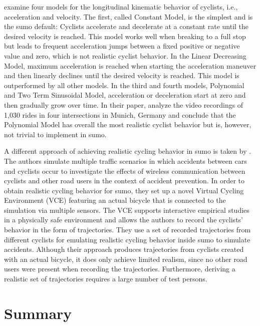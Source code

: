 \textcite{twaddle2016modeling} examine four models for the longitudinal kinematic behavior of cyclists, i.e., acceleration and velocity.
The first, called Constant Model, is the simplest and is the \ac{sumo} default:
Cyclists accelerate and decelerate at a constant rate until the desired velocity is reached.
This model works well when breaking to a full stop but leads to frequent acceleration jumps between a fixed positive or negative value and zero, which is not realistic cyclist behavior.
In the Linear Decreasing Model, maximum acceleration is reached when starting the acceleration maneuver and then linearly declines until the desired velocity is reached.
This model is outperformed by all other models.
In the third and fourth models, Polynomial and Two Term Sinusoidal Model, acceleration or deceleration start at zero and then gradually grow over time.
In their paper, \textcite{twaddle2016modeling} analyze the video recordings of 1,030 rides in four intersections in Munich, Germany and conclude that the Polynomial Model has overall the most realistic cyclist behavior but is, however, not trivial to implement in \ac{sumo}.

A different approach of achieving realistic cycling behavior in \ac{sumo} is taken by \textcite{heinovski2019modeling}.
The authors simulate multiple traffic scenarios in which accidents between cars and cyclists occur to investigate the effects of wireless communication between cyclists and other road users in the context of accident prevention.
In order to obtain realistic cycling behavior for \ac{sumo}, they set up a novel Virtual Cycling Environment (VCE) featuring an actual bicycle that is connected to the simulation via multiple sensors.
The VCE supports interactive empirical studies in a physically safe environment and allows the authors to record the cyclists' behavior in the form of trajectories.
They use a set of recorded trajectories from different cyclists for emulating realistic cycling behavior inside \ac{sumo} to simulate accidents.
Although their approach produces trajectories from cyclists created with an actual bicycle, it does only achieve limited realism, since no other road users were present when recording the trajectories.
Furthermore, deriving a realistic set of trajectories requires a large number of test persons.


\section{Summary}
\label{sec:summary_sumo}


